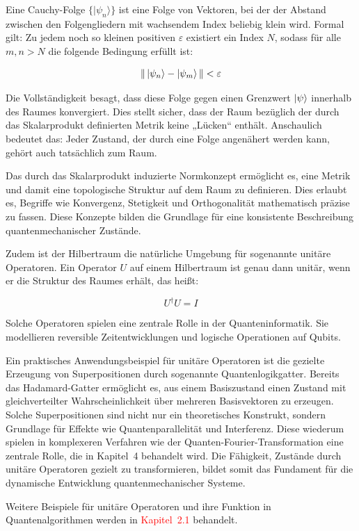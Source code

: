 Eine Cauchy-Folge \( \{ |\psi_n\rangle \} \) ist eine Folge von Vektoren, bei der der Abstand zwischen den Folgengliedern mit wachsendem Index beliebig klein wird. Formal gilt: Zu jedem noch so kleinen positiven \( \varepsilon \) existiert ein Index \( N \), sodass für alle \( m,n > N \) die folgende Bedingung erfüllt ist:

\[
\| \ket{\psi_n}  - \ket{\psi_m}  \| < \varepsilon
\]

Die Vollständigkeit besagt, dass diese Folge gegen einen Grenzwert \( \ket{\psi} \) innerhalb des Raumes konvergiert. Dies stellt sicher, dass der Raum bezüglich der durch das Skalarprodukt definierten Metrik keine „Lücken“ enthält. Anschaulich bedeutet das: Jeder Zustand, der durch eine Folge angenähert werden kann, gehört auch tatsächlich zum Raum.

Das durch das Skalarprodukt induzierte Normkonzept ermöglicht es, eine Metrik und damit eine topologische Struktur auf dem Raum zu definieren. Dies erlaubt es, Begriffe wie Konvergenz, Stetigkeit und Orthogonalität mathematisch präzise zu fassen. Diese Konzepte bilden die Grundlage für eine konsistente Beschreibung quantenmechanischer Zustände.

Zudem ist der Hilbertraum die natürliche Umgebung für sogenannte unitäre Operatoren. Ein Operator \( U \) auf einem Hilbertraum ist genau dann unitär, wenn er die Struktur des Raumes erhält, das heißt:

\[
U^\dagger U = I
\]

Solche Operatoren spielen eine zentrale Rolle in der Quanteninformatik. Sie modellieren reversible Zeitentwicklungen und logische Operationen auf Qubits.

Ein praktisches Anwendungsbeispiel für unitäre Operatoren ist die gezielte Erzeugung von Superpositionen durch sogenannte Quantenlogikgatter. Bereits das Hadamard-Gatter ermöglicht es, aus einem Basiszustand einen Zustand mit gleichverteilter Wahrscheinlichkeit über mehreren Basisvektoren zu erzeugen. Solche Superpositionen sind nicht nur ein theoretisches Konstrukt, sondern Grundlage für Effekte wie Quantenparallelität und Interferenz. Diese wiederum spielen in komplexeren Verfahren wie der Quanten-Fourier-Transformation eine zentrale Rolle, die in Kapitel~4 behandelt wird. Die Fähigkeit, Zustände durch unitäre Operatoren gezielt zu transformieren, bildet somit das Fundament für die dynamische Entwicklung quantenmechanischer Systeme.

Weitere Beispiele für unitäre Operatoren und ihre Funktion in Quantenalgorithmen werden in  \textcolor{red}{Kapitel~2.1} behandelt.


